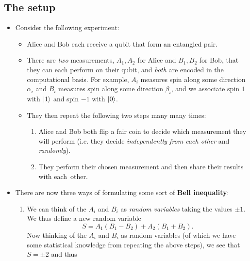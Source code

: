 \documentclass[10pt]{article}
\DeclarePairedDelimiter\ket{\lvert}{\rangle}
\begin{document}
        \subsection{The setup}

            \begin{itemize}
                \item Consider the following experiment:
                    \begin{itemize}
                        \item Alice and Bob each receive a qubit that form an entangled pair.
                        \item There are \emph{two} measurements, $A_1,A_2$ for Alice and $B_1,B_2$ for Bob, that they can each perform on their qubit, and \emph{both} are encoded in the computational basis.
                            For example, $A_i$ measures spin along some direction $\alpha_i$ and $B_i$ measures spin along some direction $\beta_i$, and we associate spin $1$ with $\ket{1}$ and spin $-1$ with $\ket{0}$.
                        \item They then repeat the following two steps many many times:
                            \begin{enumerate}
                                \item Alice and Bob both flip a fair coin to decide which measurement they will perform (i.e. they decide \emph{independently from each other} and \emph{randomly}).
                                \item They perform their chosen measurement and then share their results with \mbox{each other.}
                            \end{enumerate}
                    \end{itemize}
                \item There are now three ways of formulating some sort of \textbf{Bell inequality}:
                    \begin{enumerate}
                        \item We can think of the $A_i$ and $B_i$ as \emph{random variables} taking the values $\pm1$.
                            We thus define a new random variable $$S=A_1(B_1-B_2)+A_2(B_1+B_2).$$
                                Now thinking of the $A_i$ and $B_i$ as random variables (of which we have some statistical knowledge from repeating the above steps), we see that $S=\pm2$ and thus
                                \begin{equation*}

\end{equation*}
\end{enumerate}
\end{itemize}
\end{document}
